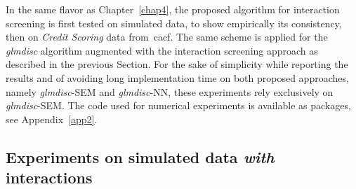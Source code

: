 In the same flavor as Chapter~\ref{chap4}, the proposed algorithm for interaction screening is first tested on simulated data, to show empirically its consistency, then on \textit{Credit Scoring} data from~\gls{cacf}. The same scheme is applied for the \textit{glmdisc} algorithm augmented with the interaction screening approach as described in the previous Section. For the sake of simplicity while reporting the results and of avoiding long implementation time on both proposed approaches, namely \textit{glmdisc}-SEM and \textit{glmdisc}-NN, these experiments rely exclusively on \textit{glmdisc}-SEM. The code used for numerical experiments is available as packages, see Appendix~\ref{app2}.

\subsection{Experiments on simulated data \textit{with} interactions}

